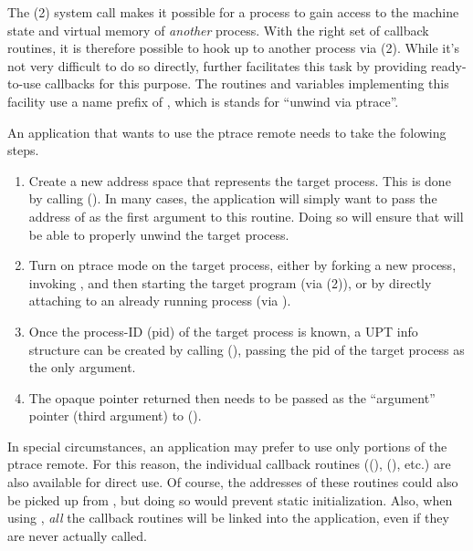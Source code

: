 \documentclass{article}
\begin{document}
The (2) system call makes it possible for a process to
gain access to the machine state and virtual memory of \emph{another}
process.  With the right set of callback routines, it is therefore
possible to hook up  to another process via
(2).  While it's not very difficult to do so directly,
 further facilitates this task by providing
ready-to-use callbacks for this purpose.  The routines and variables
implementing this facility use a name prefix of , which is
stands for ``unwind via ptrace''.

An application that wants to use the  ptrace remote needs to
take the folowing steps.
\begin{enumerate}

    \item Create a new  address space that represents the target
        process.  This is done by calling ().  In
        many cases, the application will simply want to pass the address of
         as the first argument to this routine.  Doing so
        will ensure that  will be able to properly unwind the
        target process.

    \item Turn on ptrace mode on the target process, either by forking a new
        process, invoking , and then starting the target
        program (via (2)), or by directly attaching to an already
        running process (via ).

    \item Once the process-ID (pid) of the target process is known, a
        UPT info structure can be created by calling
        (), passing the pid of the target process as the
        only argument.

    \item The opaque pointer returned then needs to be passed as the
        ``argument'' pointer (third argument) to ().

\end{enumerate}

In special circumstances, an application may prefer to use only
portions of the  ptrace remote.  For this reason, the individual
callback routines ((),
(), etc.)  are also available for direct use.  Of
course, the addresses of these routines could also be picked up from
, but doing so would prevent static initialization.  Also,
when using , \emph{all} the callback routines will be
linked into the application, even if they are never actually called.
\end{document}
